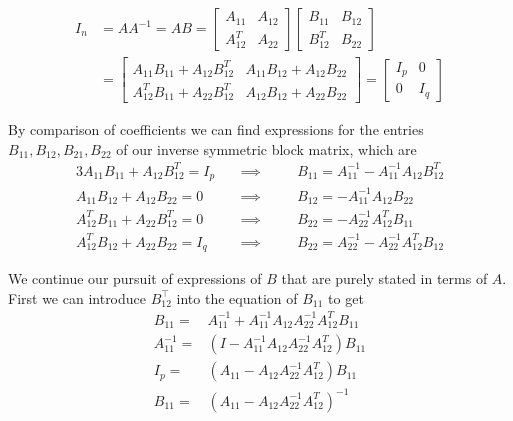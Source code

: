 \documentclass{article}
\begin{document}
$$
\begin{aligned} I_{n} &=A A^{-1}=A B=\left[ \begin{array}{cc}{A_{11}} & {A_{12}} \\ {A_{12}^{T}} & {A_{22}}\end{array}\right] \left[ \begin{array}{cc}{B_{11}} & {B_{12}} \\ {B_{12}^{T}} & {B_{22}}\end{array}\right] \\ &=\left[ \begin{array}{cc}{A_{11} B_{11}+A_{12} B_{12}^{T}} & {A_{11} B_{12}+A_{12} B_{22}} \\ {A_{12}^{T} B_{11}+A_{22} B_{12}^{T}} & {A_{12} B_{12}+A_{22} B_{22}}\end{array}\right]=\left[ \begin{array}{cc}{I_{p}} & {0} \\ {0} & {I_{q}}\end{array}\right] \end{aligned}
$$

By comparison of coefficients we can find expressions for the entries $B_{11},B_{12},B_{21},B_{22}$ of our inverse symmetric block matrix, which are
\begin{alignat*}{3}
A_{11} B_{11}+A_{12} B_{12}^{T}=I_{p} & \quad \implies \quad &&  B_{11}=A_{11}^{-1}-A_{11}^{-1} A_{12} B_{12}^{T} \\
A_{11} B_{12}+A_{12} B_{22}=0 & \quad \implies \quad && B_{12}=-A_{11}^{-1} A_{12} B_{22} \\
A_{12}^{T} B_{11}+A_{22} B_{12}^{T}=0 & \quad \implies \quad && B_{22}=-A_{22}^{-1} A_{12}^{T} B_{11} \\
A_{12}^{T} B_{12}+A_{22} B_{22}=I_{q} & \quad \implies \quad && B_{22}=A_{22}^{-1}-A_{22}^{-1} A_{12}^{T} B_{12}
\end{alignat*}

We continue our pursuit of expressions of $B$ that are purely stated in terms of $A$. 
First we can introduce $B_{12}^\top$ into the equation of $B_{11}$ to get
\begin{align*}
	B_{11}=& A_{11}^{-1}+A_{11}^{-1} A_{12} A_{22}^{-1} A_{12}^{T} B_{11} \\ 
	A_{11}^{-1} =& \left(I-A_{11}^{-1} A_{12} A_{22}^{-1} A_{12}^{T}\right) B_{11}\\
	I_{p} =& \left(A_{11}-A_{12} A_{22}^{-1} A_{12}^{T}\right) B_{11} \\
	B_{11}=& \left(A_{11}-A_{12} A_{22}^{-1} A_{12}^{T}\right)^{-1}
\end{align*}
\end{document}
